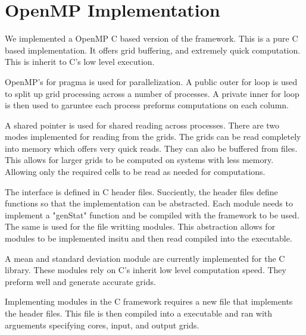 \section{OpenMP Implementation}

We implemented a OpenMP C based version of the framework.
This is a pure C based implementation.
It offers grid buffering, and extremely quick computation.
This is inherit to C's low level execution.

\par
OpenMP's for pragma is used for parallelization.
A public outer for loop is used to split up grid processing across a number of processes.
A private inner for loop is then used to garuntee each process preforms computations on each column.

\par
A shared pointer is used for shared reading across processes.
There are two modes implemented for reading from the grids.
The grids can be read completely into memory which offers very quick reads.
They can also be buffered from files.
This allows for larger grids to be computed on systems with less memory.
Allowing only the required cells to be read as needed for computations.

\par
The interface is defined in C header files.
Succiently, the header files define functions so that the implementation can be abstracted.
Each module needs to implement a "genStat" function and be compiled with the framework to be used.
The same is used for the file writting modules. 
This abstraction allows for modules to be implemented insitu and then read compiled into the executable.

\par
A mean and standard deviation module are currently implemented for the C library.
These modules rely on C's inherit low level computation speed.
They preform well and generate accurate grids.

\par
Implementing modules in the C framework requires a new file that implements the header files.
This file is then compiled into a executable and ran with arguements specifying cores, input, and output grids.